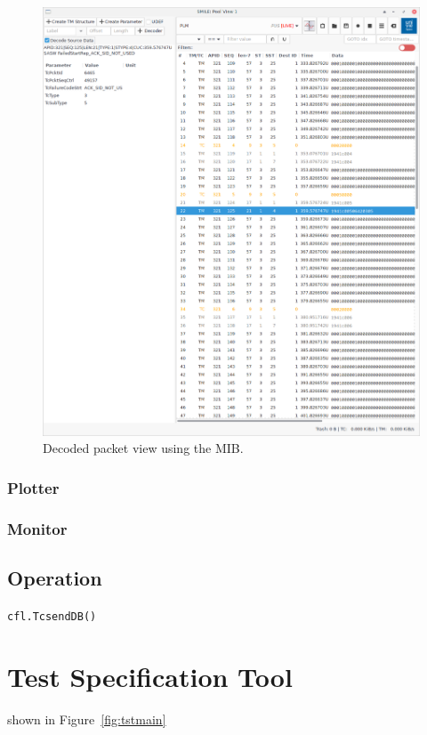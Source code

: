 \begin{figure}\label{fig:pvdec}
\includegraphics[width=1.\textwidth]{../shared/images/pvdec.png} 
\caption{Decoded packet view using the MIB.}
\end{figure}

\subsection{Plotter}

\subsection{Monitor}

\section{Operation}


\texttt{cfl.TcsendDB()}

\chapter{Test Specification Tool}
shown in Figure~\ref{fig:tstmain}

